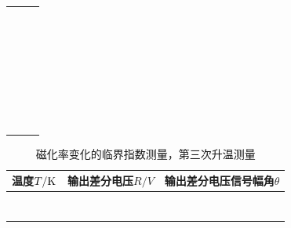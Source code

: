 \documentclass[11pt,a4paper]{ctexart}
\begin{document}
\begin{enumerate}
\begin{table}[H]
\begin{tabular}{|p{32mm}|p{32mm}|p{32mm}|}
 & & \\ \hline
  & & \\ \hline
  & & \\ \hline
   & & \\ \hline
    & & \\ \hline
 & & \\ \hline
  &  &\\ \hline
  &  &\\ \hline
  &  &\\ \hline
  &  &\\ \hline
  &  &\\ \hline
  &  &\\ \hline
  &  &\\ \hline
  &  &\\ \hline
  &  &\\ \hline
  &  &\\ \hline
  &  &\\ \hline
  &  &\\ \hline
    & &\\ \hline
  & &\\ \hline
   & &\\ \hline
     &  &\\ \hline
  &  &\\ \hline
  &  &\\ \hline
  &  &\\ \hline
  &  &\\ \hline
  &  &\\ \hline
  &  &\\ \hline
  &  &\\ \hline
    & &\\ \hline
  & &\\ \hline
   & &\\ \hline
  \end{tabular}
  \end{table}
      \begin{table}[H]
\centering
\caption{磁化率变化的临界指数测量，第三次升温测量\label{tabley6}}
\begin{tabular}{|p{32mm}|p{32mm}|p{32mm}|}
\hline
温度$T/{\rm K}$ & 输出差分电压$R/{V}$ & 输出差分电压信号幅角$\theta$ \\ \hline
 & & \\ \hline
  & & \\ \hline
  & & \\ \hline
   & & \\ \hline
    & & \\ \hline
 & & \\ \hline
  &  &\\ \hline

\end{tabular}
\end{table}
\end{enumerate}
\end{document}
